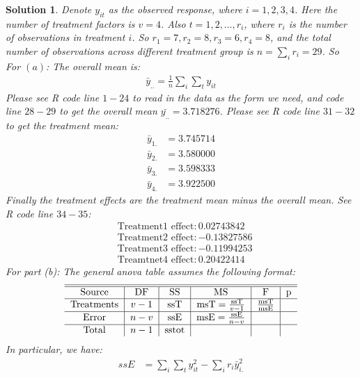 \documentclass[11pt]{article}
\newtheorem{sol}{Solution}
\begin{document}
\begin{sol}
	Denote $y_{it}$ as the observed response, where $i = 1, 2, 3, 4$. Here the number of treatment factors is $v = 4$. Also $t = 1, 2, \ldots, r_i$, where $r_i$ is the number of observations in treatment $i$. So $r_1 = 7, r_2 = 8, r_3 = 6, r_4 = 8$, and the total number of observations across different treatment group is $n = \sum_{i}r_i = 29$.\vskip 2mm
	So For $(a)$:\vskip 2mm
	The overall mean is:
	\begin{align*}
		\bar{y}_{..} = \frac{1}{n}\sum_{i}\sum_ty_{it}
	\end{align*}
	Please see R code line $1-24$ to read in the data as the form we need, and code line $28-29$ to get the overall mean $\bar{y_{..}} = 3.718276$.\vskip 2mm
	Please see R code line $31-32$ to get the treatment mean:
	\begin{align*}
		\bar{y}_{1.} &= 3.745714\\
		\bar{y}_{2.} &= 3.580000\\
		\bar{y}_{3.} &= 3.598333\\
		\bar{y}_{4.} &= 3.922500 
	\end{align*}
	Finally the treatment effects are the treatment mean minus the overall mean. See R code line $34-35$:
	\begin{align*}
		&\text{Treatment1 effect}: 0.02743842\\
		&\text{Treatment2 effect}: -0.13827586\\
		&\text{Treatment3 effect}: -0.11994253\\
		&\text{Treamtnet4 effect}: 0.20422414
	\end{align*}
	For part (b):\vskip 2mm
	The general anova table assumes the following format:
	\begin{align*}
		\begin{tabular}{c|c|c|c|c|c}
			\hline
			\hline
			\text{Source} & \text{DF} & \text{SS} & \text{MS}& \text{F}& \text{p}\\
			\hline
			\text{Treatments} & $v - 1$ & \text{ssT} & $\text{msT} = \frac{\text{ssT}}{v - 1}$ & $\frac{\text{msT}}{\text{msE}}$ & \\
			\hline
			\text{Error} & $n - v$ & \text{ssE} & $\text{msE} = \frac{\text{ssE}}{n - v}$ &  &\\
			\hline
			\text{Total} & $n - 1$ &\text{sstot} & &&
		\end{tabular}
	\end{align*}
	In particular, we have:
	\begin{align*}
		ssE &= \sum_{i}\sum_t y^2_{it} - \sum_{i}r_i\bar{y}^2_{i.}\\

\end{align*}
\end{sol}
\end{document}
